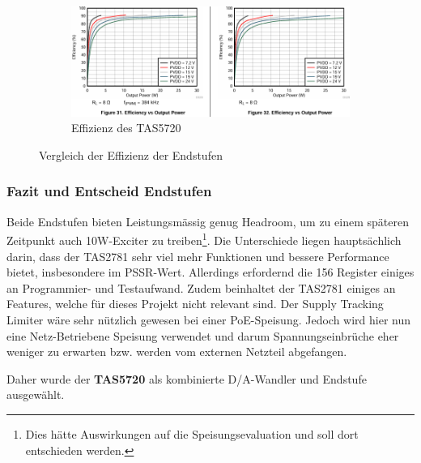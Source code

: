 \begin{figure}[ht]\ContinuedFloat
	\centering
	\begin{subfigure}{\textwidth}
		\centering
		\includegraphics[width=\textwidth*7/8]{pictures/tas5720l_efficiency.png}
		\vspace{2mm}
		\caption{Effizienz des TAS5720}
		\label{pic:effizien_TAS5720}
	\end{subfigure}
	\caption{Vergleich der Effizienz der Endstufen}
	\label{pic:effizienz_vergleich}
\end{figure}
\subsubsection{Fazit und Entscheid Endstufen}
Beide Endstufen bieten Leistungsmässig genug Headroom, um zu einem späteren Zeitpunkt auch 10W-Exciter zu treiben\footnote{Dies hätte Auswirkungen auf die Speisungsevaluation und soll dort entschieden werden.}. Die Unterschiede liegen hauptsächlich darin, dass der TAS2781 sehr viel mehr Funktionen und bessere Performance bietet, insbesondere im PSSR-Wert. Allerdings erfordernd die 156 Register einiges an Programmier- und Testaufwand. Zudem beinhaltet der TAS2781 einiges an Features, welche für dieses Projekt nicht relevant sind. Der Supply Tracking Limiter wäre sehr nützlich gewesen bei einer PoE-Speisung. Jedoch wird hier nun eine Netz-Betriebene Speisung verwendet und darum Spannungseinbrüche eher weniger zu erwarten bzw. werden vom externen Netzteil abgefangen.\\
\begin{center}
	\begin{minipage}{\textwidth*7/8}
		\centering
		{\large Daher wurde der \textbf{TAS5720} als kombinierte D/A-Wandler und Endstufe ausgewählt.}
	\end{minipage}
\end{center}
